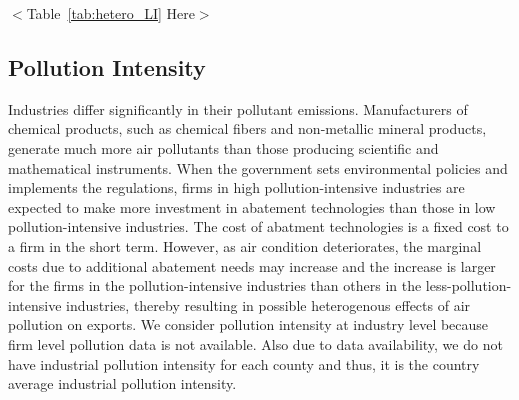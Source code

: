 \documentclass[12pt]{article}
\begin{document}


\begin{center}
$<$Table~\ref{tab:hetero_LI} Here$>$
\end{center}

\subsection{Pollution Intensity}

\label{sec:5.2.3} Industries differ significantly in their pollutant
emissions. Manufacturers of chemical products, such as chemical fibers and
non-metallic mineral products, generate much more air pollutants than those
producing scientific and mathematical instruments. When the government sets
environmental policies and implements the regulations, firms in high
pollution-intensive industries are expected to make more investment in
abatement technologies than those in low pollution-intensive industries. The
cost of abatment technologies is a fixed cost to a firm in the short term.
However, as air condition deteriorates, the marginal costs due to additional
abatement needs may increase and the increase is larger for the firms in the
pollution-intensive industries than others in the less-pollution-intensive
industries, thereby resulting in possible heterogenous effects of air
pollution on exports. We consider pollution intensity at industry level
because firm level pollution data is not available. Also due to data
availability, we do not have industrial pollution intensity for each county
and thus, it is the country average industrial pollution intensity.
\end{document}
